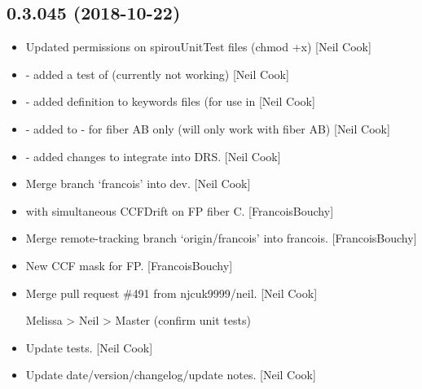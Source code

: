 \documentclass[a4paper,10pt,english]{report}
\begin{document}
\subsection{0.3.045 (2018-10-22)}
\label{\detokenize{misc/changelog:id287}}\begin{itemize}
\item {} 
Updated permissions on spirouUnitTest files (chmod +x) {[}Neil Cook{]}

\item {} 
 - added a test of  (currently
not working) {[}Neil Cook{]}

\item {} 
 - added  definition to keywords files
(for use in  {[}Neil Cook{]}

\item {} 
 - added  to  -
for fiber AB only (will only work with fiber AB) {[}Neil Cook{]}

\item {} 
 - added changes to integrate into DRS. {[}Neil
Cook{]}

\item {} 
Merge branch ‘francois’ into dev. {[}Neil Cook{]}

\item {} 
 with simultaneous CCFDrift on FP fiber C.
{[}FrancoisBouchy{]}

\item {} 
Merge remote-tracking branch ‘origin/francois’ into francois.
{[}FrancoisBouchy{]}

\item {} 
New CCF mask for FP. {[}FrancoisBouchy{]}

\item {} 
Merge pull request \#491 from njcuk9999/neil. {[}Neil Cook{]}

Melissa \textendash{}\textgreater{} Neil \textendash{}\textgreater{} Master (confirm unit tests)

\item {} 
Update tests. {[}Neil Cook{]}

\item {} 
Update date/version/changelog/update notes. {[}Neil Cook{]}

\end{itemize}
\end{document}
